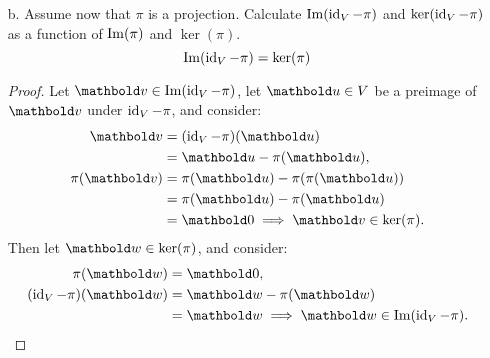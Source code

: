 \documentclass[11pt]{article}
\begin{document}
\begin{enumerate}
\begin{enumerate}
                    \begin{proof}
                        Define $\rho = \id_V - \pi$.  Then
                        \[
                            \rho^2 = \id_V - 2 \pi + \pi^2.
                        \]
                        \[
                            \rho^2 = \rho
                            \begin{aligned}
                                 & \quad \iff \quad
                                \id_V - 2 \pi + \pi^2 = \id_V - \pi \\
                                 & \quad \iff \quad
                                \pi^2 = \pi                         \\
                            \end{aligned}
                        \]
                    \end{proof}

              \item[b.] Assume now that $\pi$ is a projection.  Calculate $\operatorname{Im}(\operatorname{id}_V - \pi)$ and $\ker(\operatorname{id}_V
                        - \pi)$ as a function of $\operatorname{Im}(\pi)$ and $\ker(\pi)$.
                    \[
                        \operatorname{Im}(\operatorname{id}_V - \pi) = \ker(\pi)
                    \]
                    \begin{proof}
                        Let $\vect{v} \in \Img(\id_V - \pi)$, let $\vect{u} \in V$ be a preimage of $\vect{v}$ under
                        $\operatorname{id}_V - \pi$, and consider:
                        \[
                            \begin{aligned}
                                \vect{v}      & = (\id_V - \pi)(\vect{u})                   \\
                                              & = \vect{u} - \pi(\vect{u}),                 \\
                                \pi(\vect{v}) & = \pi(\vect{u}) - \pi(\pi(\vect{u}))        \\
                                              & = \pi(\vect{u}) - \pi(\vect{u})             \\
                                              & = \vect{0} \implies \vect{v} \in \ker(\pi).
                            \end{aligned}
                        \]
                        Then let $\vect{w} \in \ker(\pi)$, and consider:
                        \[
                            \begin{aligned}
                                \pi(\vect{w})           & = \vect{0},                                         \\
                                (\id_V - \pi)(\vect{w}) & = \vect{w} - \pi(\vect{w})                          \\
                                                        & = \vect{w} \implies \vect{w} \in \Img(\id_V - \pi).
                            \end{aligned}
                        \]
                    \end{proof}


\end{enumerate}
\end{enumerate}
\end{document}
